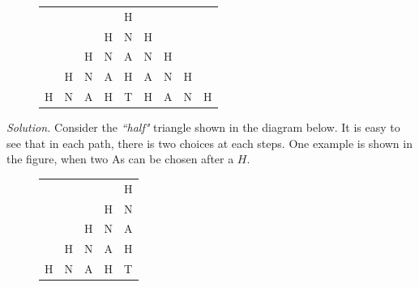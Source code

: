 \begin{multicols}{2}
\begin{figure}[H]
		\renewcommand{\arraystretch}{1.2}
		\begin{tabular}{ccccccccc}
		&   &   &   & H                                                &                                                  &                                                  &   &   \\
		&   &   & H & N                                                & H                                                &                                                  &   &   \\
		&   & H & N & A                                                & \cellcolor{cackithi!40}N & \cellcolor{cackithi!40}H &   &   \\
		& H & N & A & \cellcolor{cackithi!40}H& \cellcolor{cackithi!40}  A  & N                                                & H &   \\
		H & N & A & H & \cellcolor{cackithi!40}T & H                                                & A                                                & N &  H 
	\end{tabular} 
	\vspace*{-10pt}
	\end{figure}
	\textit{Solution.}
	Consider the \textit{``half"} triangle shown in the diagram below.
	It is easy to see that in each path, there is two choices at each steps.
	One example is shown in the figure, when two As can be chosen after a $H$.
	\begin{figure}[H]
	\vspace*{-5pt}
	\centering
	\captionsetup{labelformat= empty, justification=centering}
	\renewcommand{\arraystretch}{1.2}
	\begin{tabular}{ccccl}
		&   &                                                  &                                                  &  H                                                 \\
		&   &                                                  &  H                                                 &  N                                                 \\
		&   &  H                                                 &  N                                                 &  A                                                 \\
		&  H  &  N                                                 & \cellcolor{duongvaotoanhoc!40}  A &  H                                                 \\
		H  &  N  & \cellcolor{duongvaotoanhoc!40}  A  & \cellcolor{cackithi!40}  H  & \cellcolor{cackithi!40}  T 

\end{tabular}
\end{figure}
\end{multicols}
